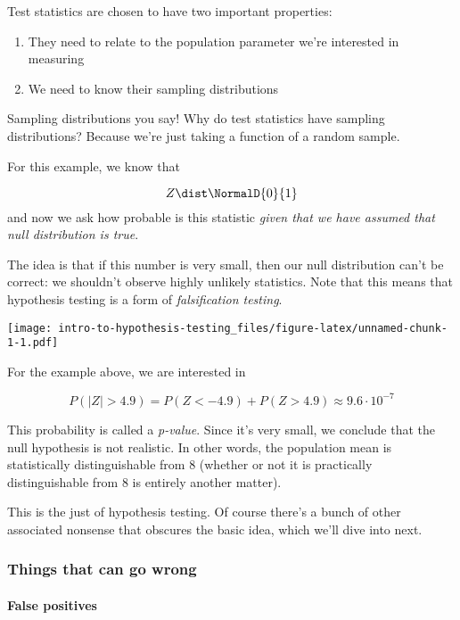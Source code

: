 \documentclass[]{article}
\providecommand{\tightlist}{%
  \setlength{\itemsep}{0pt}\setlength{\parskip}{0pt}}
\let\oldparagraph\paragraph
\renewcommand{\paragraph}[1]{\oldparagraph{#1}\mbox{}}
\begin{document}
Test statistics are chosen to have two important properties:

\begin{enumerate}
\def\labelenumi{\arabic{enumi}.}
\tightlist
\item
  They need to relate to the population parameter we're interested in
  measuring
\item
  We need to know their sampling distributions
\end{enumerate}

Sampling distributions you say! Why do test statistics have sampling
distributions? Because we're just taking a function of a random sample.

For this example, we know that

\[Z \dist \NormalD{0}{1}\] and now we ask how probable is this statistic
\emph{given that we have assumed that null distribution is true}.

The idea is that if this number is very small, then our null
distribution can't be correct: we shouldn't observe highly unlikely
statistics. Note that this means that hypothesis testing is a form of
\emph{falsification testing}.

\texttt{[image: intro-to-hypothesis-testing\_files/figure-latex/unnamed-chunk-1-1.pdf]}

For the example above, we are interested in

\[P(|Z| > 4.9) = P(Z < -4.9) + P(Z > 4.9) \approx 9.6 \cdot 10^{-7}\]

This probability is called a \emph{p-value}. Since it's very small, we
conclude that the null hypothesis is not realistic. In other words, the
population mean is statistically distinguishable from 8 (whether or not
it is practically distinguishable from 8 is entirely another matter).

This is the just of hypothesis testing. Of course there's a bunch of
other associated nonsense that obscures the basic idea, which we'll dive
into next.

\hypertarget{things-that-can-go-wrong}{%
\subsubsection{Things that can go
wrong}\label{things-that-can-go-wrong}}

\hypertarget{false-positives}{%
\paragraph{False positives}\label{false-positives}}
\end{document}
